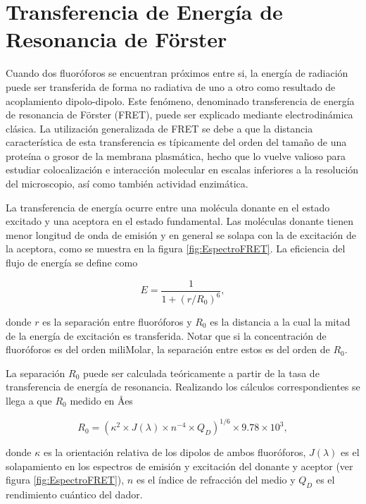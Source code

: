 \section{Transferencia de Energía de Resonancia de Förster}

Cuando dos fluoróforos se encuentran próximos entre si, la energía de radiación puede ser transferida de forma no radiativa de uno a otro como resultado de acoplamiento dipolo-dipolo\cite{GreccoBastiaens2009}. Este fenómeno, denominado transferencia de energía de resonancia de Förster (FRET), puede ser explicado mediante electrodinámica clásica. La utilización generalizada de FRET se debe a que la distancia característica de esta transferencia es típicamente del orden del tamaño de una proteína o grosor de la membrana plasmática, hecho que lo vuelve valioso para estudiar colocalización e interacción molecular en escalas inferiores a la resolución del microscopio, así como también actividad enzimática\cite{Lakowicz2006}.

La transferencia de energía ocurre entre una molécula donante en el estado excitado y una aceptora en el estado fundamental. Las moléculas donante tienen menor longitud de onda de emisión y en general se solapa con la de excitación de la aceptora, como se muestra en la figura \ref{fig:EspectroFRET}\cite{Lakowicz2006}. La eficiencia del flujo de energía se define como

\begin{equation}
    E = \frac{1}{1+ \left( r/R_0 \right)^6},
\end{equation}

\noindent donde $r$ es la separación entre fluoróforos y $R_0$ es la distancia a la cual la mitad de la energía de excitación es transferida. Notar que si la concentración de fluoróforos es del orden miliMolar, la separación entre estos es del orden de $R_0$.

La separación $R_0$ puede ser calculada teóricamente a partir de la tasa de transferencia de energía de resonancia. Realizando los cálculos correspondientes se llega a que $R_0$ medido en \AA es

\begin{equation}
    R_0=(\kappa^2 \times J(\lambda) \times n^{-4} \times Q_D)^{1/6}\times 9.78 \times 10^3,
\end{equation}

\noindent donde $\kappa$ es la orientación relativa de los dipolos de ambos fluoróforos, $J(\lambda)$ es el solapamiento en los espectros de emisión y excitación del donante y aceptor (ver figura \ref{fig:EspectroFRET}), $n$ es el índice de refracción del medio y $Q_D$ es el rendimiento cuántico del dador\cite{Lakowicz2006}.

